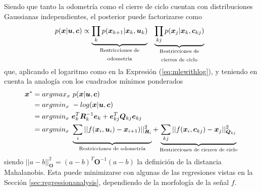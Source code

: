 Siendo que tanto la odometría como el cierre de ciclo cuentan con distribuciones Gaussianas independientes, el posterior puede factorizarse como
\begin{equation}
    p(\bm{x}|\bm{u},\bm{c}) \propto \underbrace{\prod_k p(\bm{x}_{k+1}|\bm{x}_{k},\bm{u}_k)}_{\text{\parbox{10em}{\centering Restricciones de odometría}}}\ \underbrace{\prod_{kj}p(\bm{x}_j|\bm{x}_k,\bm{c}_{kj})}_{\text{\parbox{10em}{\centering Restricciones de cierres de ciclo}}}
\end{equation}
que, aplicando el logaritmo como en la Expresión (\ref{eq:mlewithlog}), y teniendo en cuenta la analogía con los cuadrados mínimos ponderados
\begin{align}
    \bm{x}^* &= argmax_x\ p(\bm{x}|\bm{u},\bm{c}) \\
    &= argmin_x\ -log(\bm{x}|\bm{u},\bm{c}) \\
     &= argmin_x\ \bm{e}_k^T\bm{R}_k^{-1}\bm{e}_k + \bm{e}_{kj}^T\bm{Q}_{kj}\bm{e}_{kj} \\
     &= argmin_x\ \underbrace{\sum_{i} ||f(\bm{x}_i,\bm{u}_i)-\bm{x}_{i+1})||^2_{\bm{R}_i}}_{\text{{\centering Restricciones de odometría}}} + \underbrace{\sum_{kj} ||f(\bm{x}_i,\bm{c}_{kj}) - \bm{x}_{j}||^2_{\bm{Q}_{kj}}}_{\text{{\centering Restricciones de cierres de ciclo}}}
\end{align}
siendo $||a-b||^2_{\bm{O}} = (a - b)^T\bm{O}^{-1}(a-b)$ la definición de la distancia Mahalanobis. Esta puede minimizarse con algunas de las regresiones vistas en la Sección \ref{sec:regressionanalysis}, dependiendo de la morfología de la señal $f$.

